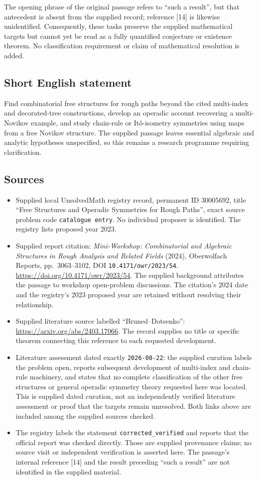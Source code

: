 \documentclass[11pt]{article}
\begin{document}
The opening phrase of the original passage refers to ``such a result'', but that antecedent is absent from the supplied record; reference [14] is likewise unidentified. Consequently, these tasks preserve the supplied mathematical targets but cannot yet be read as a fully quantified conjecture or existence theorem. No classification requirement or claim of mathematical resolution is added.
\subsection{Short English statement}
Find combinatorial free structures for rough paths beyond the cited multi-index and decorated-tree constructions, develop an operadic account recovering a multi-Novikov example, and study chain-rule or It\^o-isometry symmetries using maps from a free Novikov structure. The supplied passage leaves essential algebraic and analytic hypotheses unspecified, so this remains a research programme requiring clarification.
\subsection{Sources}
\begin{itemize}
\item Supplied local UnsolvedMath registry record, permanent ID \(30005692\), title ``Free Structures and Operadic Symmetries for Rough Paths'', exact source problem code \texttt{catalogue entry}. No individual proposer is identified. The registry lists proposed year 2023.
\item Supplied report citation: \emph{Mini-Workshop: Combinatorial and Algebraic Structures in Rough Analysis and Related Fields} (2024), Oberwolfach Reports, pp.\ 3063--3102, DOI \texttt{10.4171/owr/2023/54}. \url{https://doi.org/10.4171/owr/2023/54}. The supplied background attributes the passage to workshop open-problem discussions. The citation's 2024 date and the registry's 2023 proposed year are retained without resolving their relationship.
\item Supplied literature source labelled ``Bruned--Dotsenko'': \url{https://arxiv.org/abs/2403.17066}. The record supplies no title or specific theorem connecting this reference to each requested development.
\item Literature assessment dated exactly \texttt{2026-08-22}: the supplied curation labels the problem open, reports subsequent development of multi-index and chain-rule machinery, and states that no complete classification of the other free structures or general operadic symmetry theory requested here was located. This is supplied dated curation, not an independently verified literature assessment or proof that the targets remain unresolved. Both links above are included among the supplied sources checked.
\item The registry labels the statement \texttt{corrected\_verified} and reports that the official report was checked directly. Those are supplied provenance claims; no source visit or independent verification is asserted here. The passage's internal reference [14] and the result preceding ``such a result'' are not identified in the supplied material.
\end{itemize}
\end{document}

